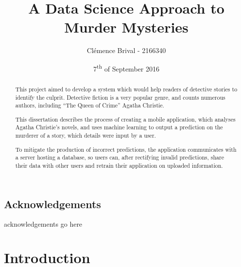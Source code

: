 \documentclass{mproj}
\begin{document}
\title{A Data Science Approach to Murder Mysteries}
\author{Cl\'{e}mence Brival - 2166340}
\date{7\textsuperscript{th} of September 2016}
\maketitle


\begin{abstract}
This project aimed to develop a system which would help readers of detective stories to identify the culprit. Detective fiction is a very popular genre, and counts numerous authors, including ``The Queen of Crime'' Agatha Christie. 

This dissertation describes the process of creating a mobile application, which analyses Agatha Christie's novels, and uses machine learning to output a prediction on the murderer of a story, which details were input by a user. 

To mitigate the production of incorrect predictions, the application communicates with a server hosting a database, so users can, after rectifying invalid predictions, share their data with other users and retrain their application on uploaded information.
\end{abstract}


\educationalconsent


\newpage
\section*{Acknowledgements}

acknowledgements go here


\tableofcontents


\chapter{Introduction}\label{intro}
\end{document}
